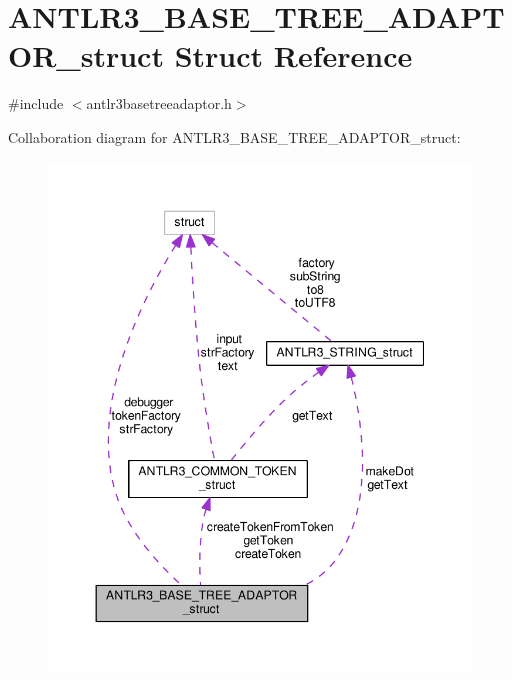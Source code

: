 \hypertarget{struct_a_n_t_l_r3___b_a_s_e___t_r_e_e___a_d_a_p_t_o_r__struct}{\section{A\-N\-T\-L\-R3\-\_\-\-B\-A\-S\-E\-\_\-\-T\-R\-E\-E\-\_\-\-A\-D\-A\-P\-T\-O\-R\-\_\-struct Struct Reference}
\label{struct_a_n_t_l_r3___b_a_s_e___t_r_e_e___a_d_a_p_t_o_r__struct}
}


{\ttfamily \#include $<$antlr3basetreeadaptor.\-h$>$}



Collaboration diagram for A\-N\-T\-L\-R3\-\_\-\-B\-A\-S\-E\-\_\-\-T\-R\-E\-E\-\_\-\-A\-D\-A\-P\-T\-O\-R\-\_\-struct\-:
\nopagebreak
\begin{figure}[H]
\begin{center}
\leavevmode
\includegraphics[width=347pt]{struct_a_n_t_l_r3___b_a_s_e___t_r_e_e___a_d_a_p_t_o_r__struct__coll__graph}
\end{center}
\end{figure}
